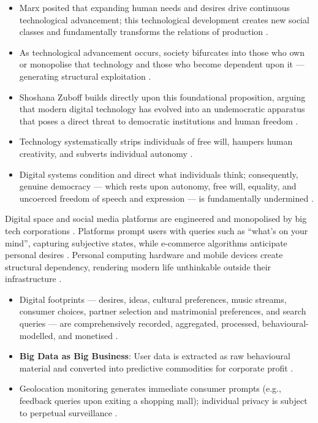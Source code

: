 \begin{KeyConcept}
\begin{itemize}
    \item Marx posited that expanding human needs and desires drive continuous technological advancement; this technological development creates new social classes and fundamentally transforms the relations of production .
    \item As technological advancement occurs, society bifurcates into those who own or monopolise that technology and those who become dependent upon it --- generating structural exploitation .
    \item Shoshana Zuboff builds directly upon this foundational proposition, arguing that modern digital technology has evolved into an undemocratic apparatus that poses a direct threat to democratic institutions and human freedom .
    \item Technology systematically strips individuals of free will, hampers human creativity, and subverts individual autonomy .
    \item Digital systems condition and direct what individuals think; consequently, genuine democracy --- which rests upon autonomy, free will, equality, and uncoerced freedom of speech and expression --- is fundamentally undermined .
\end{itemize}
\end{KeyConcept}

Digital space and social media platforms are engineered and monopolised by big tech corporations . Platforms prompt users with queries such as ``what's on your mind'', capturing subjective states, while e-commerce algorithms anticipate personal desires . Personal computing hardware and mobile devices create structural dependency, rendering modern life unthinkable outside their infrastructure .

\begin{ExampleBox}
\begin{itemize}
    \item Digital footprints --- desires, ideas, cultural preferences, music streams, consumer choices, partner selection and matrimonial preferences, and search queries --- are comprehensively recorded, aggregated, processed, behavioural-modelled, and monetised .
    \item \textbf{Big Data as Big Business}: User data is extracted as raw behavioural material and converted into predictive commodities for corporate profit .
    \item Geolocation monitoring generates immediate consumer prompts (e.g., feedback queries upon exiting a shopping mall); individual privacy is subject to perpetual surveillance .
\end{itemize}
\end{ExampleBox}

